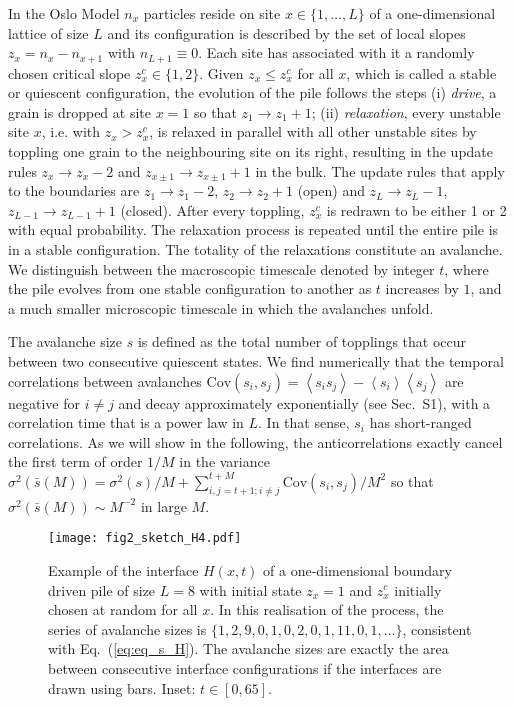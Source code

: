 \documentclass[doublecol]{epl2}
\newcommand{\ave}[1]{\left\langle{#1}\right\rangle}
\newcommand{\Eref}[1]{Eq.~(\ref{eq:#1})}
\newcommand{\bungledXR}[2]{#2}
\begin{document}
\label{sect_oslo}
In the Oslo Model \cite{ChristensenETAL:1996} $n_x$ particles reside on site $x\in\{1,\ldots,L\}$ of a one-dimensional lattice of size $L$ and its configuration is described by the set of local slopes $z_x=n_x-n_{x+1}$ with $n_{L+1} \equiv 0$. Each site has associated with it a randomly chosen critical slope $z_x^c\in\{1,2\}$. Given $z_x\leq z_x^c$ for all $x$, which is called a stable or quiescent configuration, the evolution of the pile follows the steps (i) \emph{drive}, a grain is dropped at site $x=1$ so that $z_1\to z_1+1$; (ii) \emph{relaxation}, every unstable site $x$, i.e. with $z_x>z_x^c$, is relaxed in parallel with all other unstable sites by toppling one grain to the neighbouring site on its right, resulting in the update rules $z_x\to z_x-2$ and $z_{x\pm1}\to z_{x\pm1}+1$ in the bulk. The update rules that apply to the boundaries are $z_1\to z_1-2$, $z_2\to z_2+1$ (open) and $z_L\to z_L-1$, $z_{L-1}\to z_{L-1}+1$ (closed). After every toppling, $z_x^c$ is redrawn to be either 1 or 2 with equal probability. The relaxation process is repeated until the entire pile is in a stable configuration. The totality of the relaxations constitute an avalanche. We distinguish between the macroscopic timescale denoted by integer $t$, where the pile evolves from one stable configuration to another as $t$ increases by $1$, and a much smaller microscopic timescale in which the avalanches unfold.

The avalanche size $s$ is defined as the total number of topplings that occur between two consecutive quiescent states. We find numerically that the temporal correlations between avalanches $\text{Cov}(s_i,s_{j})=\ave{s_is_{j}}-\ave{s_i}\ave{s_{j}}$ are negative for $i\neq j$ and decay approximately exponentially (see \bungledXR{}{Sec.~S1}), with a correlation time that is a power law in $L$. In that sense, $s_i$ has short-ranged correlations. As we will show in the following, the anticorrelations exactly cancel the first term of order $1/M$ in the variance $\sigma^2\left(\bar{s}(M)\right) = \sigma^2\left(s\right)/M + \sum_{i,j=t+1; i\neq j}^{t+M}\text{Cov}(s_i,s_j)/M^2$ so that $\sigma^2\left(\bar{s}(M)\right) \sim M^{-2}$ in large $M$.

\label{sect_interf}
\begin{figure}[t]
\centering
 \texttt{[image: fig2\_sketch\_H4.pdf]}
  \caption{ \label{fig_s_sketch}
 Example of the interface $H(x,t)$ of a one-dimensional boundary driven pile of size $L=8$ with initial state $z_x=1$ and $z_x^c$ initially chosen at random for all $x$. In this realisation of the process, the series of avalanche sizes is $\{1,2,9,0,1,0,2,0,1,11,0,1,\ldots\}$, consistent with \Eref{eq_s_H}. The avalanche sizes are exactly the area between consecutive interface configurations if the interfaces are drawn using bars. Inset: $t\in[0,65]$.}
 \end{figure}
\end{document}
